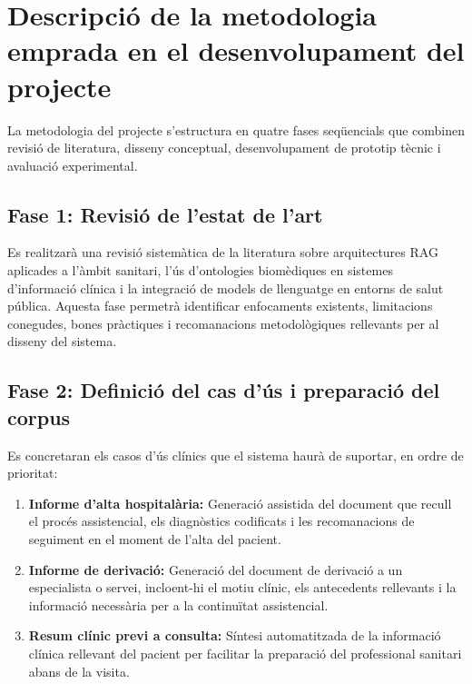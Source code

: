 \documentclass[11pt,a4paper]{article}
\begin{document}
\newpage
{}
\section*{Descripció de la metodologia emprada en el desenvolupament del projecte}

La metodologia del projecte s'estructura en quatre fases seqüencials que combinen revisió de literatura, disseny conceptual, desenvolupament de prototip tècnic i avaluació experimental.

\subsection*{Fase 1: Revisió de l'estat de l'art}
Es realitzarà una revisió sistemàtica de la literatura sobre arquitectures RAG aplicades a l'àmbit sanitari, l'ús d'ontologies biomèdiques en sistemes d'informació clínica i la integració de models de llenguatge en entorns de salut pública. Aquesta fase permetrà identificar enfocaments existents, limitacions conegudes, bones pràctiques i recomanacions metodològiques rellevants per al disseny del sistema.

\subsection*{Fase 2: Definició del cas d'ús i preparació del corpus}
Es concretaran els casos d'ús clínics que el sistema haurà de suportar, en ordre de prioritat:

\begin{enumerate}
    \item \textbf{Informe d'alta hospitalària:} Generació assistida del document que recull el procés assistencial, els diagnòstics codificats i les recomanacions de seguiment en el moment de l'alta del pacient.
    
    \item \textbf{Informe de derivació:} Generació del document de derivació a un especialista o servei, incloent-hi el motiu clínic, els antecedents rellevants i la informació necessària per a la continuïtat assistencial.
    
    \item \textbf{Resum clínic previ a consulta:} Síntesi automatitzada de la informació clínica rellevant del pacient per facilitar la preparació del professional sanitari abans de la visita.
\end{enumerate}
\end{document}
